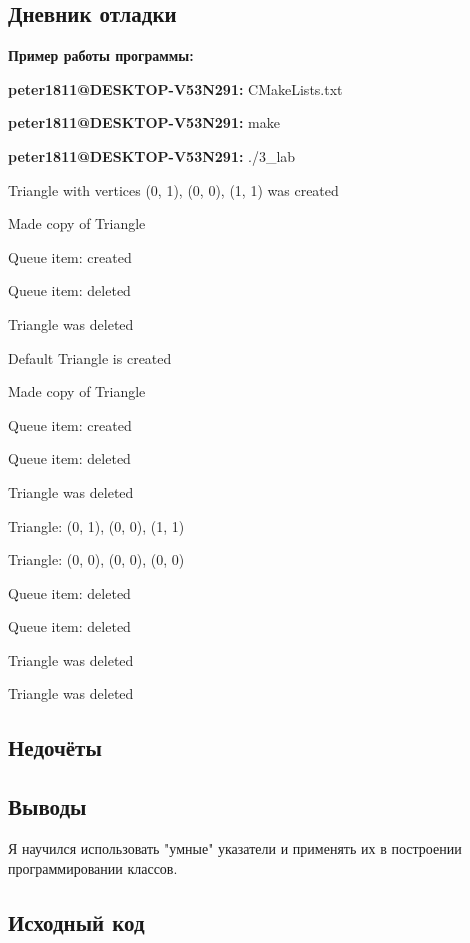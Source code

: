 \documentclass[12pt]{article}
\begin{document}
\subsection*{Дневник отладки}

\begin{left}

\textbf{Пример работы программы: }

\textbf{peter1811@DESKTOP-V53N291:}  CMakeLists.txt
    
\textbf{peter1811@DESKTOP-V53N291:} make
    
\textbf{peter1811@DESKTOP-V53N291:} ./3\_lab

Triangle with vertices (0, 1), (0, 0), (1, 1) was created

Made copy of Triangle

Queue item: created

Queue item: deleted

Triangle was deleted

Default Triangle is created

Made copy of Triangle

Queue item: created

Queue item: deleted

Triangle was deleted

{Triangle: (0, 1), (0, 0), (1, 1)}

{Triangle: (0, 0), (0, 0), (0, 0)}

Queue item: deleted

Queue item: deleted

Triangle was deleted

Triangle was deleted


\end{left}

\subsection*{Недочёты}


\subsection*{Выводы}

Я научился использовать "умные" указатели и применять их в построении программировании классов.


\vfill

\subsection*{Исходный код}
\end{document}
